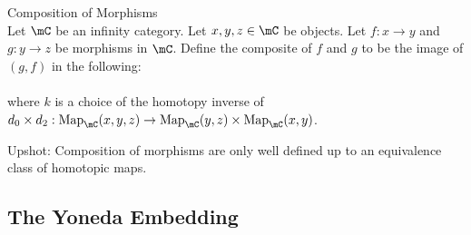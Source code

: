 \documentclass[a4paper]{article}
\begin{document}
\begin{defn}{Composition of Morphisms}{}\\ Let $\mC$ be an infinity category. Let $x,y,z\in\mC$ be objects. Let $f:x\to y$ and $g:y\to z$ be morphisms in $\mC$. Define the composite of $f$ and $g$ to be the image of $(g,f)$ in the following: \\
\\
where $k$ is a choice of the homotopy inverse of $d_0\times d_2:\text{Map}_\mC(x,y,z)\to\text{Map}_\mC(y,z)\times\text{Map}_\mC(x,y)$. 
\end{defn}

Upshot: Composition of morphisms are only well defined up to an equivalence class of homotopic maps. 

\subsection{The Yoneda Embedding}

\pagebreak
\end{document}
